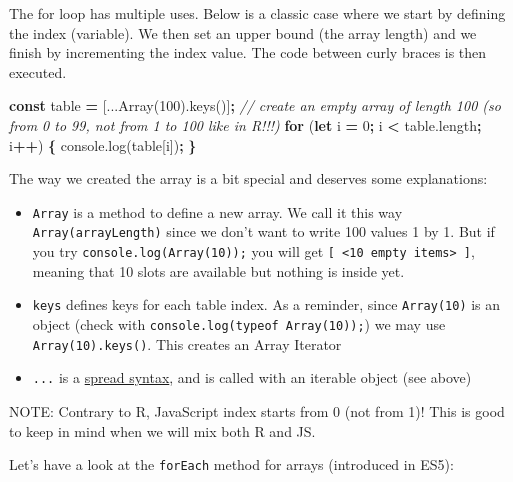 \documentclass[]{book}
\newenvironment{Shaded}{\begin{snugshade}}{\end{snugshade}}
\newcommand{\AttributeTok}[1]{\textcolor[rgb]{0.77,0.63,0.00}{#1}}
\newcommand{\CommentTok}[1]{\textcolor[rgb]{0.56,0.35,0.01}{\textit{#1}}}
\newcommand{\ControlFlowTok}[1]{\textcolor[rgb]{0.13,0.29,0.53}{\textbf{#1}}}
\newcommand{\DecValTok}[1]{\textcolor[rgb]{0.00,0.00,0.81}{#1}}
\newcommand{\KeywordTok}[1]{\textcolor[rgb]{0.13,0.29,0.53}{\textbf{#1}}}
\newcommand{\NormalTok}[1]{#1}
\newcommand{\OperatorTok}[1]{\textcolor[rgb]{0.81,0.36,0.00}{\textbf{#1}}}
\newcommand{\VariableTok}[1]{\textcolor[rgb]{0.00,0.00,0.00}{#1}}
\providecommand{\tightlist}{%
  \setlength{\itemsep}{0pt}\setlength{\parskip}{0pt}}
\begin{document}
The for loop has multiple uses. Below is a classic case where we start by defining the index (variable). We then set an upper bound (the array length) and we finish by incrementing the index value. The code between curly braces is then executed.

\begin{Shaded}
\begin{Highlighting}[]
\KeywordTok{const}\NormalTok{ table }\OperatorTok{=}\NormalTok{ [...}\AttributeTok{Array}\NormalTok{(}\DecValTok{100}\NormalTok{).}\AttributeTok{keys}\NormalTok{()]}\OperatorTok{;} \CommentTok{// create an empty array of length 100 (so from 0 to 99, not from 1 to 100 like in R!!!)}
\ControlFlowTok{for}\NormalTok{ (}\KeywordTok{let}\NormalTok{ i }\OperatorTok{=} \DecValTok{0}\OperatorTok{;}\NormalTok{ i }\OperatorTok{<} \VariableTok{table}\NormalTok{.}\AttributeTok{length}\OperatorTok{;}\NormalTok{ i}\OperatorTok{++}\NormalTok{) }\OperatorTok{\{}
    \VariableTok{console}\NormalTok{.}\AttributeTok{log}\NormalTok{(table[i])}\OperatorTok{;} 
\OperatorTok{\}}
\end{Highlighting}
\end{Shaded}

The way we created the array is a bit special and deserves some explanations:

\begin{itemize}
\tightlist
\item
  \texttt{Array} is a method to define a new array. We call it this way \texttt{Array(arrayLength)} since we don't want to write 100 values 1 by 1. But if you try \texttt{console.log(Array(10));} you will get \texttt{{[}\ \textless{}10\ empty\ items\textgreater{}\ {]}}, meaning that 10 slots are available but nothing is inside yet.
\item
  \texttt{keys} defines keys for each table index. As a reminder, since \texttt{Array(10)} is an object (check with \texttt{console.log(typeof\ Array(10));}) we may use \texttt{Array(10).keys()}. This creates an Array Iterator
\item
  \texttt{...} is a \href{https://developer.mozilla.org/en-US/docs/Web/JavaScript/Reference/Operators/Spread_syntax}{spread syntax}, and is called with an iterable object (see above)
\end{itemize}

NOTE: Contrary to R, JavaScript index starts from 0 (not from 1)! This is good to keep in mind when we will mix both R and JS.

Let's have a look at the \texttt{forEach} method for arrays (introduced in ES5):
\end{document}
